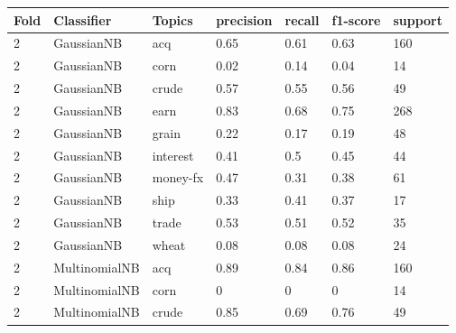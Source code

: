 \documentclass{article}
\begin{document}
\begin{table}[h]
\begin{tabular}{lllllll}
\textbf{Fold} & \textbf{Classifier}    & \textbf{Topics} & \textbf{precision} & \textbf{recall} & \textbf{f1-score} & \textbf{support} \\ \hline
2             & GaussianNB             & acq             & 0.65               & 0.61            & 0.63              & 160              \\
2             & GaussianNB             & corn            & 0.02               & 0.14            & 0.04              & 14               \\
2             & GaussianNB             & crude           & 0.57               & 0.55            & 0.56              & 49               \\
2             & GaussianNB             & earn            & 0.83               & 0.68            & 0.75              & 268              \\
2             & GaussianNB             & grain           & 0.22               & 0.17            & 0.19              & 48               \\
2             & GaussianNB             & interest        & 0.41               & 0.5             & 0.45              & 44               \\
2             & GaussianNB             & money-fx        & 0.47               & 0.31            & 0.38              & 61               \\
2             & GaussianNB             & ship            & 0.33               & 0.41            & 0.37              & 17               \\
2             & GaussianNB             & trade           & 0.53               & 0.51            & 0.52              & 35               \\
2             & GaussianNB             & wheat           & 0.08               & 0.08            & 0.08              & 24               \\
2             & MultinomialNB          & acq             & 0.89               & 0.84            & 0.86              & 160              \\
2             & MultinomialNB          & corn            & 0                  & 0               & 0                 & 14               \\
2             & MultinomialNB          & crude           & 0.85               & 0.69            & 0.76              & 49               \\

\end{tabular}
\end{table}
\end{document}

